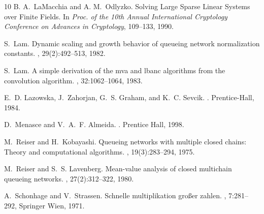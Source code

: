 \documentclass[journal,twocolumn,9.5pt]{IEEEtran}
\begin{document}
\begin{thebibliography}{10}
B. A.~LaMacchia and A. M.~Odlyzko.
\newblock Solving Large Sparse Linear Systems over Finite Fields.
\newblock In {\em Proc. of the 10th Annual International Cryptology Conference on Advances in Cryptology}, 109--133, 1990.

S.~Lam.
\newblock Dynamic scaling and growth behavior of queueing network normalization
  constants.
, 29(2):492--513, 1982.

S.~Lam.
\newblock A simple derivation of the {\sc mva} and {\sc lbanc} algorithms from
  the convolution algorithm.
, 32:1062--1064, 1983.


E.~D. Lazowska, J.~Zahorjan, G.~S. Graham, and K.~C. Sevcik.
.
\newblock Prentice-Hall, 1984.

%
D.~Menasce and V.~A.~F. Almeida.
.
\newblock Prentice Hall, 1998.


M.~Reiser and H.~Kobayashi.
\newblock Queueing networks with multiple closed chains: Theory and
  computational algorithms.
, 19(3):283--294, 1975.

M.~Reiser and S.~S. Lavenberg.
\newblock Mean-value analysis of closed multichain queueing networks.
, 27(2):312--322, 1980.

A.~Schonhage and V.~Strassen.
\newblock Schnelle multiplikation großer zahlen.
, 7:281--292, Springer Wien, 1971.



\end{thebibliography}
\end{document}
